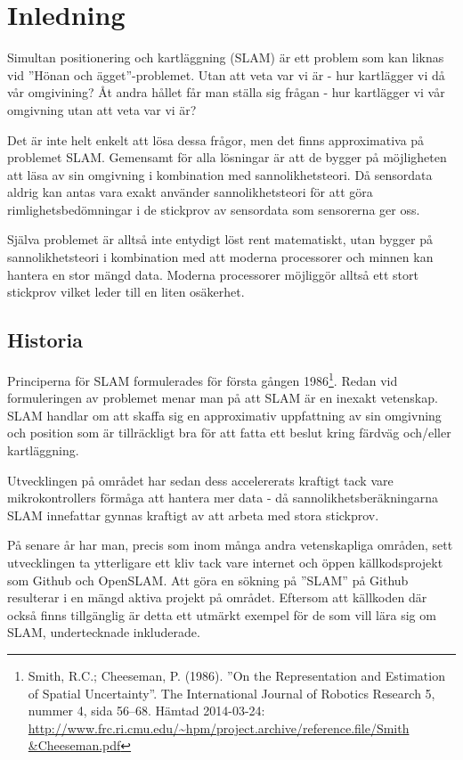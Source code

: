 \documentclass[a4paper,12pt,fleqn]{article} \usepackage{fixltx2e}
\begin{document}
\section{Inledning}

Simultan positionering och kartläggning (SLAM) är ett problem som kan
liknas vid ''Hönan och ägget''-problemet. Utan att veta var vi är - hur
kartlägger vi då vår omgivining? Åt andra hållet får man ställa sig
frågan - hur kartlägger vi vår omgivning utan att veta var vi är?

Det är inte helt enkelt att lösa dessa frågor, men det finns
approximativa på problemet SLAM. Gemensamt för alla lösningar är att de
bygger på möjligheten att läsa av sin omgivning i kombination med
sannolikhetsteori. Då sensordata aldrig kan antas vara exakt använder
sannolikhetsteori för att göra rimlighetsbedömningar i de stickprov av
sensordata som sensorerna ger oss.

Själva problemet är alltså inte entydigt löst rent matematiskt, utan
bygger på sannolikhetsteori i kombination med att moderna processorer
och minnen kan hantera en stor mängd data. Moderna processorer möjliggör
alltså ett stort stickprov vilket leder till en liten osäkerhet.

\subsection{Historia}

Principerna för SLAM formulerades för första gången 1986\footnote{Smith,
R.C.; Cheeseman, P. (1986). ''On the Representation and Estimation of
Spatial Uncertainty''. The International Journal of Robotics Research 5,
nummer 4, sida 56–68. Hämtad 2014-03-24:
\url{http://www.frc.ri.cmu.edu/~hpm/project.archive/reference.file/Smith
&Cheeseman.pdf}}. Redan vid formuleringen av problemet menar man på att
SLAM är en inexakt vetenskap. SLAM handlar om att skaffa sig en
approximativ uppfattning av sin omgivning och position som är
tillräckligt bra för att fatta ett beslut kring färdväg och/eller
kartläggning.

Utvecklingen på området har sedan dess accelererats kraftigt tack vare
mikrokontrollers förmåga att hantera mer data - då
sannolikhetsberäkningarna SLAM innefattar gynnas kraftigt av att arbeta
med stora stickprov.

På senare år har man, precis som inom många andra vetenskapliga områden,
sett utvecklingen ta ytterligare ett kliv tack vare internet och öppen
källkodsprojekt som Github och OpenSLAM. Att göra en sökning på ''SLAM''
på Github resulterar i en mängd aktiva projekt på området. Eftersom att
källkoden där också finns tillgänglig är detta ett utmärkt exempel för
de som vill lära sig om SLAM, undertecknade inkluderade.
\end{document}
